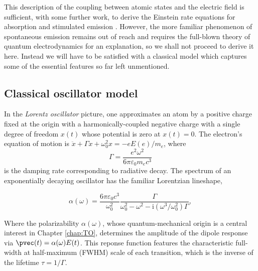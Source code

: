 	

	This description of the coupling between atomic states and the electric field is sufficient, with some further work, to derive the Einstein rate equations for absorption and stimulated emission \cite{FootAtomic}.
	However, the more familiar phenomenon of spontaneous emission remains out of reach and requires the full-blown theory of quantum electrodynamics for an explanation, so we shall not proceed to derive it here.
	Instead we will have to be satisfied with a classical model which captures some of the essential features so far left unmentioned.



	\subsection*{Classical oscillator model}

	In the \emph{Lorentz oscillator} picture, one approximates an atom by a positive charge fixed at the origin with a harmonically-coupled negative charge with a single degree of freedom $x(t)$ whose potential is zero at $x(t)=0$.
	The electron's equation of motion is $\ddot{x} + \Gamma\dot{x} + \omega_0^2x = -e E(e)/m_e$, where
	\begin{equation}
		\Gamma = \frac{e^2\omega^2}{6\pi \varepsilon_0 m_e c^3}
	\end{equation}
	is the damping rate corresponding to radiative decay.
	The spectrum of an exponentially decaying oscillator has the familiar Lorentzian lineshape,

	\begin{equation}
		\alpha(\omega) = \frac{6\pi\varepsilon_0c^3}{\omega_0^2}\frac{\Gamma}{\omega_0^2-\omega^2-\textrm{i}(\omega^3/\omega_0^2)\Gamma},
		\label{eqn:lorentzian}
	\end{equation}

	Where the polarizability $\alpha(\omega)$, whose quantum-mechanical origin is a central interest in Chapter \ref{chap:TO}, determines the amplitude of the dipole response via $\pvec(t) = \alpha(\omega)E(t)$.
	This reponse function features the characteristic full-width at half-maximum (FWHM) scale of each transition, which is the inverse of the lifetime $\tau=1/\Gamma$.

